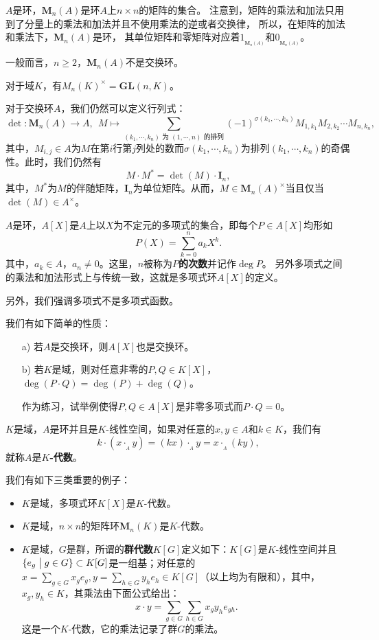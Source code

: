 \documentclass[lang=cn,10pt]{elegantbook}
\begin{document}
	\begin{example}
		$A$是环，$\mathbf{M}_n(A)$是环$A$上$n\times n$的矩阵的集合。
		注意到，矩阵的乘法和加法只用到了分量上的乘法和加法并且不使用乘法的逆或者交换律，
		所以，在矩阵的加法和乘法下，$\mathbf{M}_n(A)$是环，
		其单位矩阵和零矩阵对应着$1_{_{\mathbf{M}_n(A)}}$和$0_{_{\mathbf{M}_n(A)}}$。
		
		一般而言，$n\geqslant 2$，$\mathbf{M}_n(A)$不是交换环。
		
		对于域$K$，有$M_n(K)^\times=\mathbf{GL}(n,K)$。
		
		对于交换环$A$，我们仍然可以定义行列式：
		\[\det\colon {\mathbf{M}_n(A)}\rightarrow A,  \ \ M\mapsto \!\!\! \!\!\! \!\!\!\sum_{(k_1,\cdots,k_n)\text{ 为 }(1,\cdots,n)\text{ 的排列}} \!\!\! \!\!\! \!\!\! (-1)^{\sigma(k_1,\cdots,k_n)}M_{1,k_1}M_{2,k_2}\cdots M_{n,k_n},\]
		其中，$M_{i,j}\in A$为$M$在第$i$行第$j$列处的数而$\sigma(k_1,\cdots,k_n)$为排列$(k_1,\cdots,k_n)$的奇偶性。此时，我们仍然有
		\[M\cdot M^*=\det(M)\cdot \mathbf{I}_n,\]
		其中，$M^*$为$M$的伴随矩阵，$\mathbf{I}_n$为单位矩阵。从而，$M\in {\mathbf{M}_n(A)}^\times$当且仅当$\det(M)\in A^\times$。
	\end{example}
	\begin{example}[多项式环]
		$A$是环，$A[X]$是$A$上以$X$为不定元的多项式的集合，即每个$P\in A[X]$均形如
		\[P(X)=\sum_{k=0}^n a_k X^k.\]
		其中，$a_k\in A$，$a_n\neq 0$。这里，$n$被称为{\bf $P$的次数}并记作$\deg P$。
		另外多项式之间的乘法和加法形式上与传统一致，这就是多项式环$A[X]$的定义。
		
		另外，我们强调多项式不是多项式函数。
		
		我们有如下简单的性质：
		
		\begin{itemize}
			\item[a)]若$A$是交换环，则$A[X]$也是交换环。
			\item[b)]若$K$是域，则对任意非零的$P,Q\in K[X]$，$\deg(P\cdot Q)=\deg(P)+\deg(Q)$。
			
			作为练习，试举例使得$P,Q\in A[X]$是非零多项式而$P\cdot Q=0$。
		\end{itemize}
	\end{example}
	\begin{example}[$K$-代数]
		$K$是域，$A$是环并且是$K$-线性空间，如果对任意的$x,y\in A$和$k\in K$，我们有
		\[k\cdot(x\cdot_{_A}y) = (k x)\cdot_{_A} y = x\cdot_{_A} (k y),\]
		就称$A$是{\bf $K$-代数}。
		
		我们有如下三类重要的例子：
		\begin{itemize}
			\item $K$是域，多项式环$K[X]$是$K$-代数。
			\item $K$是域，$n\times n$的矩阵环$\mathbf{M}_n(K)$是$K$-代数。
			\item $K$是域，$G$是群，所谓的{\bf 群代数$K[G]$}定义如下：$K[G]$是$K$-线性空间并且$\{e_g\bigm|g\in G\}\subset K[G]$是一组基；对任意的$x=\sum_{g\in G}x_g e_g, y=\sum_{h\in G}y_h e_h\in K[G]$（以上均为有限和），其中，$x_g,y_h\in K$，其乘法由下面公式给出：
			\[x\cdot y=\sum_{g\in G}\sum_{h\in G}x_g y_h e_{gh}.\]
			这是一个$K$-代数，它的乘法记录了群$G$的乘法。
		\end{itemize}
	\end{example}
\end{document}
